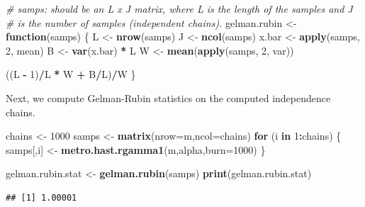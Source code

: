 \documentclass[
  11pt,
]{paper}
\newenvironment{Shaded}{\begin{snugshade}}{\end{snugshade}}
\newcommand{\AttributeTok}[1]{\textcolor[rgb]{0.13,0.29,0.53}{#1}}
\newcommand{\CommentTok}[1]{\textcolor[rgb]{0.56,0.35,0.01}{\textit{#1}}}
\newcommand{\ControlFlowTok}[1]{\textcolor[rgb]{0.13,0.29,0.53}{\textbf{#1}}}
\newcommand{\DecValTok}[1]{\textcolor[rgb]{0.00,0.00,0.81}{#1}}
\newcommand{\FunctionTok}[1]{\textcolor[rgb]{0.13,0.29,0.53}{\textbf{#1}}}
\newcommand{\NormalTok}[1]{#1}
\newcommand{\OtherTok}[1]{\textcolor[rgb]{0.56,0.35,0.01}{#1}}
\newcommand{\SpecialCharTok}[1]{\textcolor[rgb]{0.81,0.36,0.00}{\textbf{#1}}}
\begin{document}
\begin{Shaded}
\begin{Highlighting}[]
\CommentTok{\# samps: should be an L x J matrix, where L is the length of the samples and J}
\CommentTok{\# is the number of samples (independent chains).}
\NormalTok{gelman.rubin }\OtherTok{\textless{}{-}} \ControlFlowTok{function}\NormalTok{(samps) \{}
\NormalTok{    L }\OtherTok{\textless{}{-}} \FunctionTok{nrow}\NormalTok{(samps)}
\NormalTok{    J }\OtherTok{\textless{}{-}} \FunctionTok{ncol}\NormalTok{(samps)}
\NormalTok{    x.bar }\OtherTok{\textless{}{-}} \FunctionTok{apply}\NormalTok{(samps, }\DecValTok{2}\NormalTok{, mean)}
\NormalTok{    B }\OtherTok{\textless{}{-}} \FunctionTok{var}\NormalTok{(x.bar) }\SpecialCharTok{*}\NormalTok{ L}
\NormalTok{    W }\OtherTok{\textless{}{-}} \FunctionTok{mean}\NormalTok{(}\FunctionTok{apply}\NormalTok{(samps, }\DecValTok{2}\NormalTok{, var))}

\NormalTok{    ((L }\SpecialCharTok{{-}} \DecValTok{1}\NormalTok{)}\SpecialCharTok{/}\NormalTok{L }\SpecialCharTok{*}\NormalTok{ W }\SpecialCharTok{+}\NormalTok{ B}\SpecialCharTok{/}\NormalTok{L)}\SpecialCharTok{/}\NormalTok{W}
\NormalTok{\}}
\end{Highlighting}
\end{Shaded}

Next, we compute Gelman-Rubin statistics on the computed independence
chains.

\begin{Shaded}
\begin{Highlighting}[]
\NormalTok{chains }\OtherTok{\textless{}{-}} \DecValTok{1000}
\NormalTok{samps }\OtherTok{\textless{}{-}} \FunctionTok{matrix}\NormalTok{(}\AttributeTok{nrow=}\NormalTok{m,}\AttributeTok{ncol=}\NormalTok{chains)}
\ControlFlowTok{for}\NormalTok{ (i }\ControlFlowTok{in} \DecValTok{1}\SpecialCharTok{:}\NormalTok{chains)}
\NormalTok{\{}
\NormalTok{  samps[,i] }\OtherTok{\textless{}{-}} \FunctionTok{metro.hast.rgamma1}\NormalTok{(m,alpha,}\AttributeTok{burn=}\DecValTok{1000}\NormalTok{)}
\NormalTok{\}}

\NormalTok{gelman.rubin.stat }\OtherTok{\textless{}{-}} \FunctionTok{gelman.rubin}\NormalTok{(samps)}
\FunctionTok{print}\NormalTok{(gelman.rubin.stat)}
\end{Highlighting}
\end{Shaded}

\begin{verbatim}
## [1] 1.00001
\end{verbatim}
\end{document}
